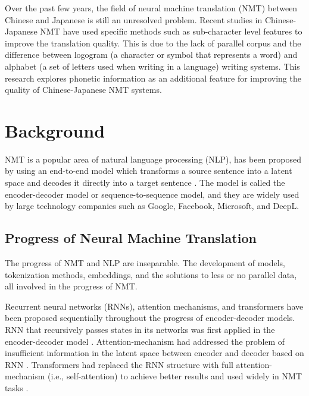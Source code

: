 \hspace{24pt}

Over the past few years, the field of neural machine translation (NMT) between Chinese and Japanese is still an unresolved problem. Recent studies in Chinese-Japanese NMT have used specific methods such as sub-character level features to improve the translation quality. This is due to the lack of parallel corpus and the difference between logogram (a character or symbol that represents a word) and alphabet (a set of letters used when writing in a language) writing systems. This research explores phonetic information as an additional feature for improving the quality of Chinese-Japanese NMT systems.

\section{Background} \label{sec:background}

NMT is a popular area of natural language processing (NLP), has been proposed by using an end-to-end model which transforms a source sentence into a latent space and decodes it directly into a target sentence \cite{sutskever2014sequence, cho2014learning}. The model is called the encoder-decoder model or sequence-to-sequence model, and they are widely used by large technology companies such as Google, Facebook, Microsoft, and DeepL.

\subsection{Progress of Neural Machine Translation} \label{sec:nmt}

The progress of NMT and NLP are inseparable. The development of models, tokenization methods, embeddings, and the solutions to less or no parallel data, all involved in the progress of NMT.

Recurrent neural networks (RNNs), attention mechanisms, and transformers have been proposed sequentially throughout the progress of encoder-decoder models. RNN that recursively passes states in its networks was first applied in the encoder-decoder model \cite{cho2014learning}. Attention-mechanism had addressed the problem of insufficient information in the latent space between encoder and decoder based on RNN \cite{bahdanau2014neural}. Transformers had replaced the RNN structure with full attention-mechanism (i.e., self-attention) to achieve better results and used widely in NMT tasks \cite{NIPS2017_3f5ee243}. 


